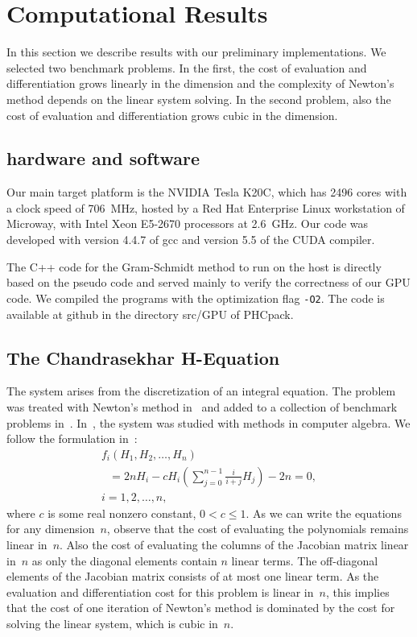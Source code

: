 \documentclass{article}
\begin{document}
\section{Computational Results}

In this section we describe results with our preliminary implementations.
We selected two benchmark problems.  In the first, the cost of evaluation
and differentiation grows linearly in the dimension and the complexity of
Newton's method depends on the linear system solving.
In the second problem, also the cost of evaluation and differentiation
grows cubic in the dimension.

\subsection{hardware and software}

Our main target platform is the NVIDIA Tesla K20C,
which has 2496 cores with a clock speed of 706~MHz,
hosted by a Red Hat Enterprise Linux workstation of Microway,
with Intel Xeon E5-2670 processors at 2.6~GHz.
Our code was developed with version 4.4.7 of gcc
and version 5.5 of the CUDA compiler.





The C++ code for the Gram-Schmidt method to run on the host is
directly based on the pseudo code and served mainly to verify
the correctness of our GPU code.
We compiled the programs with the optimization flag {\tt -O2}.
The code is available at github in the directory src/GPU
of PHCpack.

\subsection{The Chandrasekhar H-Equation}

The system arises from the discretization of an integral equation.
The problem was treated with Newton's method in~\cite{Kel80}
and added to a collection of benchmark problems in~\cite{Mor90}.
In~\cite{Gon95}, the system was studied with methods in computer algebra.
We follow the formulation in~\cite{Gon95}:
\begin{equation}
  \begin{array}{l}
   f_i(H_1,H_2,\ldots,H_n) \\
   ~~~= 2 n H_i - c H_i
{\displaystyle \left( \sum_{j=0}^{n-1} \frac{i}{i+j} H_j \right)}
     - 2n = 0, \\
   i=1,2,\ldots,n,
  \end{array}
\end{equation}
where $c$ is some real nonzero constant, $0 < c \leq 1$.
As we can write the equations for any dimension~$n$,
observe that the cost of evaluating the polynomials remains
linear in~$n$.  Also the cost of evaluating the columns of 
the Jacobian matrix linear in~$n$ as only the diagonal elements
contain $n$ linear terms.  The off-diagonal elements of the
Jacobian matrix consists of at most one linear term.
As the evaluation and differentiation cost for this problem
is linear in~$n$, this implies that the cost of one iteration
of Newton's method is dominated by the cost for solving the
linear system, which is cubic in~$n$.
\end{document}
